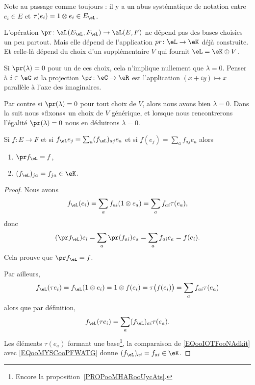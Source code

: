 Note au passage comme toujours : il y a un abus systématique de notation entre \( e_i\in E\) et \( \tau(e_i)=1\otimes e_i\in E_{\eL}\).

\begin{remark}       \label{REMooBEXGooLgpHzg}
    L'opération \( \pr\colon \aL(E_{\eL},F_{\eL})\to \aL(E,F)\) ne dépend pas des bases choisies un peu partout. Mais elle dépend de l'application \( pr\colon \eL\to \eK\) déjà construite. Et celle-là dépend du choix d'un supplémentaire $V$ qui fournit \( \eL=\eK\oplus V\).

    Si \( \pr(\lambda)=0\) pour un de ces choix, cela n'implique nullement que \( \lambda=0\). Penser à \( i\in \eC\) si la projection \( \pr\colon \eC\to \eR\) est l'application \( (x+iy)\mapsto x\) parallèle à l'axe des imaginaires.

    Par contre si \( \pr(\lambda)=0\) pour tout choix de \( V\), alors nous avons bien \( \lambda=0\). Dans la suit nous «fixons» un choix de \( V\) générique, et lorsque nous rencontrerons l'égalité \( \pr(\lambda)=0\) nous en déduirons \( \lambda=0\).
\end{remark}

\begin{proposition} \label{PROPooPWDKooFNFWRI}
    Si \( f\colon E\to F\) et si \( f_{\eL}e_j=\sum_a(f_{\eL})_{aj}e_a\) et si \( f(e_j)=\sum_af_{aj}e_a\) alors
    \begin{enumerate}
        \item
            \( \pr f_{\eL}=f\),
        \item       \label{ITEMooNMPYooXosGhI}
            \( (f_{\eL})_{ja}=f_{ja} \in \eK\).
    \end{enumerate}
\end{proposition}

\begin{proof}
    Nous avons
    \begin{equation}
        f_{\eL}(e_i)=\sum_a f_{ai}(1\otimes e_a)=\sum_a f_{ai}\tau(e_a),
    \end{equation}
    donc
    \begin{equation}
        (\pr f_{\eL})e_i=\sum_a\pr(f_{ai})e_a=\sum_af_{ai}e_a=f(e_i).
    \end{equation}
    Cela prouve que \( \pr f_{\eL}=f\).

    Par ailleurs,
    \begin{equation}        \label{EQooIOTFooNAdkit}
        f_{\eL}(\tau e_i)=f_{\eL}(1\otimes e_i)=1\otimes f(e_i)=\tau\big( f(e_i) \big)=\sum_af_{ai}\tau(e_a)
    \end{equation}
    alors que par définition,
    \begin{equation}        \label{EQooMYSCooPFWATG}
        f_{\eL}(\tau e_i)=\sum_a(f_{\eL})_{ai}\tau(e_a).
    \end{equation}
    Les éléments \( \tau(e_a)\) formant une base\footnote{Encore la proposition~\ref{PROPooMHARooUycAts}.}, la comparaison de \eqref{EQooIOTFooNAdkit} avec \eqref{EQooMYSCooPFWATG} donne \( (f_{\eL})_{ai}=f_{ai}\in \eK\).
\end{proof}


